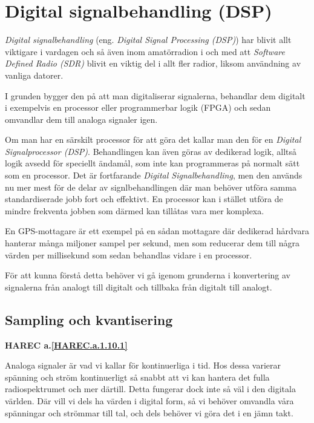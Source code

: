 \section{Digital signalbehandling (DSP)}
\label{DSP}

\emph{Digital signalbehandling} (eng. \emph{Digital Signal Processing (DSP)})
har blivit allt viktigare i vardagen och så även inom amatörradion i och med
att \emph{Software Defined Radio (SDR)} blivit en viktig del i allt fler
radior, liksom användning av vanliga datorer.

I grunden bygger den på att man digitaliserar signalerna, behandlar dem
digitalt i exempelvis en processor eller programmerbar logik (FPGA) och sedan
omvandlar dem till analoga signaler igen.

Om man har en särskilt processor för att göra det kallar man den för en
\emph{Digital Signalprocessor (DSP)}.
Behandlingen kan även göras av dedikerad logik, alltså logik avsedd för speciellt
ändamål, som inte kan programmeras på normalt sätt som en processor. Det är fortfarande
\emph{Digital Signalbehandling}, men den används nu mer mest för de delar av
signlbehandlingen där man behöver utföra samma standardiserade jobb fort och
effektivt.
En processor kan i stället utföra de mindre frekventa jobben som därmed kan
tillåtas vara mer komplexa.

En GPS-mottagare är ett exempel på en sådan mottagare där dedikerad hårdvara
hanterar många miljoner sampel per sekund, men som reducerar dem till några värden
per millisekund som sedan behandlas vidare i en processor.

För att kunna förstå detta behöver vi gå igenom grunderna i konvertering av
signalerna från analogt till digitalt och tillbaka från digitalt till analogt.

\subsection{Sampling och kvantisering}
\textbf{HAREC a.\ref{HAREC.a.1.10.1}\label{myHAREC.a.1.10.1}}

Analoga signaler är vad vi kallar för kontinuerliga i tid. Hos dessa varierar spänning och
ström kontinuerligt så snabbt att vi kan hantera det fulla radiospektrumet och mer därtill.
Detta fungerar dock inte så väl i den digitala världen.
Där vill vi dels ha värden i digital form, så vi behöver omvandla våra spänningar
och strömmar till tal, och dels behöver vi göra det i en jämn takt.


